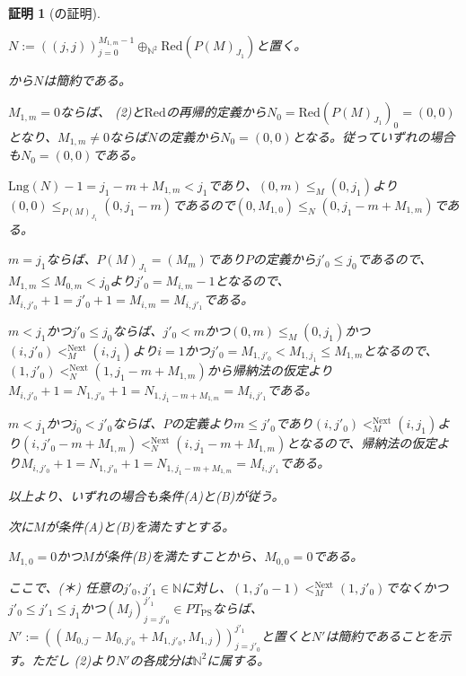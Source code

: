 \documentclass[dvipdfmx,uplatex]{jsarticle}
\theoremstyle{customnonumberbreakfortheorem}
\theoremstyle{customnonumberbreakforproof}
\newtheorem{hideableproof}{証明}
\begin{document}
\begin{hideableproof}[の証明]
\begin{indented}
\begin{indented}
\begin{indented}
\begin{indented}
\begin{indented}
\begin{indented}
							\item \(N := ((j,j))_{j=0}^{M_{1,m}-1} \oplus_{\mathbb{N}^2} \textrm{Red}(P(M)_{J_1})\)と置く。
							\item {}から\(N\)は簡約である。
							\item \(M_{1,m}=0\)ならば、 (2)と\(\textrm{Red}\)の再帰的定義から\(N_0 = \textrm{Red}(P(M)_{J_1})_0 = (0,0)\)となり、\(M_{1,m} \neq 0\)ならば\(N\)の定義から\(N_0 = (0,0)\)となる。従っていずれの場合も\(N_0 = (0,0)\)である。
							\item \(\textrm{Lng}(N) - 1 = j_1 - m + M_{1,m} < j_1\)であり、\((0,m) \leq_M (0,j_1)\)より\((0,0) \leq_{P(M)_{J_1}} (0,j_1-m)\)であるので\((0,M_{1,0}) \leq_N (0,j_1-m+M_{1,m})\)である。
							\item \(m = j_1\)ならば、\(P(M)_{J_1} = (M_m)\)であり\(P\)の定義から\(j'_0 \leq j_0\)であるので、\(M_{1,m} \leq M_{0,m} < j_0\)より\(j'_0 = M_{i,m}-1\)となるので、\(M_{i,j'_0}+1 = j'_0+1 = M_{i,m} = M_{i,j'_1}\)である。
							\item \(m < j_1\)かつ\(j'_0 \leq j_0\)ならば、\(j'_0 < m\)かつ\((0,m) \leq_M (0,j_1)\)かつ\((i,j'_0) <_M^{\textrm{Next}} (i,j_1)\)より\(i = 1\)かつ\(j'_0 = M_{1,j'_0} < M_{1,j_1} \leq M_{1,m}\)となるので、\((1,j'_0) <_N^{\textrm{Next}} (1,j_1 - m + M_{1,m})\)から帰納法の仮定より\(M_{i,j'_0}+1 = N_{1,j'_0} + 1 = N_{1,j_1 - m + M_{1,m}} = M_{i,j'_1}\)である。
							\item \(m < j_1\)かつ\(j_0 < j'_0\)ならば、\(P\)の定義より\(m \leq j'_0\)であり\((i,j'_0) <_M^{\textrm{Next}} (i,j_1)\)より\((i,j'_0-m+M_{1,m}) <_N^{\textrm{Next}} (i,j_1-m+M_{1,m})\)となるので、帰納法の仮定より\(M_{i,j'_0}+1 = N_{1,j'_0} + 1 = N_{1,j_1 - m + M_{1,m}} = M_{i,j'_1}\)である。
						\end{indented}
					\end{indented}
				\end{indented}
				\item 以上より、いずれの場合も条件(A)と(B)が従う。
			\end{indented}
			\item 次に\(M\)が条件(A)と(B)を満たすとする。
			\begin{indented}
				\item \(M_{1,0} = 0\)かつ\(M\)が条件(B)を満たすことから、\(M_{0,0} = 0\)である。
				\item ここで、(＊) 任意の\(j'_0, j'_1 \in \mathbb{N}\)に対し、\((1,j'_0-1) <_M^{\textrm{Next}} (1,j'_0)\)でなくかつ\(j'_0 \leq j'_1 \leq j_1\)かつ\((M_j)_{j=j'_0}^{j'_1} \in PT_{\textrm{PS}}\)ならば、\(N' := ((M_{0,j}-M_{0,j'_0}+M_{1,j'_0},M_{1,j}))_{j=j'_0}^{j'_1}\)と置くと\(N'\)は簡約であることを示す。ただし (2)より\(N'\)の各成分は\(\mathbb{N}^2\)に属する。

\end{indented}
\end{indented}
\end{indented}
\end{hideableproof}
\end{document}
